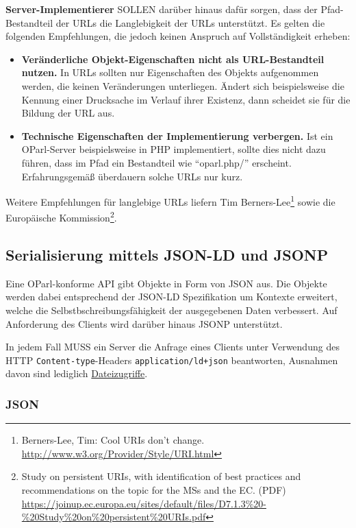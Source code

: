 \documentclass[,a4paper]{article}
\begin{document}
\textbf{Server-Implementierer} SOLLEN darüber hinaus dafür sorgen, dass
der Pfad-Bestandteil der URLs die Langlebigkeit der URLs unterstützt. Es
gelten die folgenden Empfehlungen, die jedoch keinen Anspruch auf
Vollständigkeit erheben:

\begin{itemize}
\item
  \textbf{Veränderliche Objekt-Eigenschaften nicht als URL-Bestandteil
  nutzen.} In URLs sollten nur Eigenschaften des Objekts aufgenommen
  werden, die keinen Veränderungen unterliegen. Ändert sich
  beispielsweise die Kennung einer Drucksache im Verlauf ihrer Existenz,
  dann scheidet sie für die Bildung der URL aus.
\item
  \textbf{Technische Eigenschaften der Implementierung verbergen.} Ist
  ein OParl-Server beispielsweise in PHP implementiert, sollte dies
  nicht dazu führen, dass im Pfad ein Bestandteil wie ``oparl.php/''
  erscheint. Erfahrungsgemäß überdauern solche URLs nur kurz.
\end{itemize}

Weitere Empfehlungen für langlebige URLs liefern Tim
Berners-Lee\footnote{Berners-Lee, Tim: Cool URIs don't change.
  \url{http://www.w3.org/Provider/Style/URI.html}} sowie die Europäische
Kommission\footnote{Study on persistent URIs, with identification of
  best practices and recommendations on the topic for the MSs and the
  EC. (PDF)
  \url{https://joinup.ec.europa.eu/sites/default/files/D7.1.3\%20-\%20Study\%20on\%20persistent\%20URIs.pdf}}.

\subsection{Serialisierung mittels JSON-LD und
JSONP}\label{serialisierung-mittels-json-ld-und-jsonp}

Eine OParl-konforme API gibt Objekte in Form von JSON aus. Die Objekte
werden dabei entsprechend der JSON-LD Spezifikation um Kontexte
erweitert, welche die Selbstbschreibungsfähigkeit der ausgegebenen Daten
verbessert. Auf Anforderung des Clients wird darüber hinaus JSONP
unterstützt.

In jedem Fall MUSS ein Server die Anfrage eines Clients unter Verwendung
des HTTP \texttt{Content-type}-Headers \texttt{application/ld+json}
beantworten, Ausnahmen davon sind lediglich
\hyperref[dateizugriff]{Dateizugriffe}.

\subsubsection{JSON}\label{json}
\end{document}
